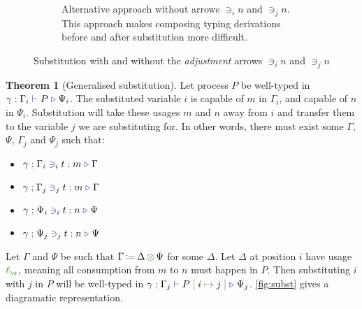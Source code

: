 \documentclass[a4paper,UKenglish,cleveref,autoref,thm-restate,authorcolumns]{lipics-v2019}
\theoremstyle{definition}
\newtheorem{nitheorem}{Theorem}
\newcommand{\type}[1]{\textcolor{BlueViolet}{\operatorname{#1}}}
\newcommand{\func}[1]{\textcolor{OliveGreen}{\operatorname{#1}}}
\newcommand{\subst}[3]{#1 \; \func{[} \; #3 \; \func{\mapsto} \;#2 \; \func{]}}
\newcommand{\opctx}[3]{#1 \, \func{\coloneqq} \, #2 \, \func{\otimes} \, #3}
\newcommand{\lz}{\func{\ell_{\o}}}
\newcommand{\types}[4]{#1 \; \type{;} \; #2 \; \type{\vdash} \; #3 \; \type{\triangleright} \; #4}
\newcommand{\contains}[6]{#1 \; \type{;} \; #2 \; \type{\ni}_{#3} \; #4 \; \type{;} \; #5 \; \type{\triangleright} \; #6}
\begin{document}
\begin{figure}[h]
\begin{subfigure}{.4\textwidth}
    \caption{
      Alternative approach without arrows $\ni_i n$ and $\ni_j n$.
      This approach makes composing typing derivations before and after substitution more difficult.
    }
    \label{fig:subst-alternative}
  \end{subfigure}
  \caption{Substitution with and without the \emph{adjustment} arrows $\ni_i n$ and $\ni_j n$}
\end{figure}

\begin{nitheorem}[Generalised substitution]
  \label{thm:subst-generalization}
  Let process $P$ be well-typed in $\types{\gamma}{\Gamma_i}{P}{\Psi_i}$.
  The substituted variable $i$ is capable of $m$ in $\Gamma_i$, and capable of $n$ in $\Psi_i$.
  Substitution will take these usages $m$ and $n$ away from $i$ and transfer them to the variable $j$ we are substituting for.
  In other words, there must exist some $\Gamma$, $\Psi$, $\Gamma_j$ and $\Psi_j$ such that:
  \begin{multicols}{2}
  \begin{itemize}
    \item $\contains{\gamma}{\Gamma_i}{i}{t}{m}{\Gamma}$
    \item $\contains{\gamma}{\Gamma_j}{j}{t}{m}{\Gamma}$
    \item $\contains{\gamma}{\Psi_i}{i}{t}{n}{\Psi}$
    \item $\contains{\gamma}{\Psi_j}{j}{t}{n}{\Psi}$
  \end{itemize}
  \end{multicols}
  Let $\Gamma$ and $\Psi$ be such that $\opctx{\Gamma}{\Delta}{\Psi}$ for some $\Delta$.
  Let $\Delta$ at position $i$ have usage $\lz$, meaning all consumption from $m$ to $n$ must happen in $P$.
  Then substituting $i$ with $j$ in $P$ will be well-typed in $\types{\gamma}{\Gamma_j}{\subst{P}{j}{i}}{\Psi_j}$.
  \autoref{fig:subst} gives a diagramatic representation.
\end{nitheorem}
\end{document}
